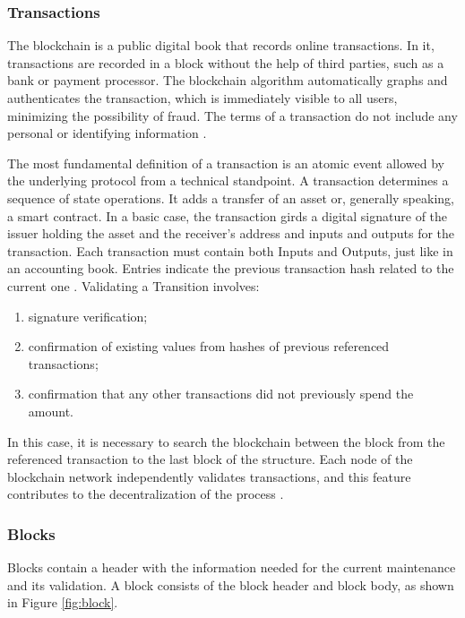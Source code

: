 \subsubsection{Transactions}\label{sec:transac}
The blockchain is a public digital book that records online transactions. In it, transactions are recorded in a block without the help of third parties, such as a bank or payment processor. The blockchain algorithm automatically graphs and authenticates the transaction, which is immediately visible to all users, minimizing the possibility of fraud. The terms of a transaction do not include any personal or identifying information \cite{Bankrate2018}.

The most fundamental definition of a transaction is an atomic event allowed by the underlying protocol from a technical standpoint. A transaction determines a sequence of state operations.  It adds a transfer of an asset or, generally speaking, a smart contract.  In a basic case, the transaction girds a digital signature of the issuer holding the asset and the receiver's address and inputs and outputs for the transaction. Each transaction must contain both Inputs and Outputs, just like in an accounting book. Entries indicate the previous transaction hash related to the current one \cite{greve2018blockchain}. Validating a Transition involves:

\begin{enumerate}
	\item signature verification;
	\item confirmation of existing values from hashes of previous referenced transactions;
	\item confirmation that any other transactions did not previously spend the amount.
\end{enumerate}

In this case, it is necessary to search the blockchain between the block from the referenced transaction to the last block of the structure. Each node of the blockchain network independently validates transactions, and this feature contributes to the decentralization of the process \cite{greve2018blockchain}.

\subsubsection{Blocks}\label{sec:blocks}
Blocks contain a header with the information needed for the current maintenance and its validation. A block consists of the block header and block body, as shown in Figure \ref{fig:block}. 

